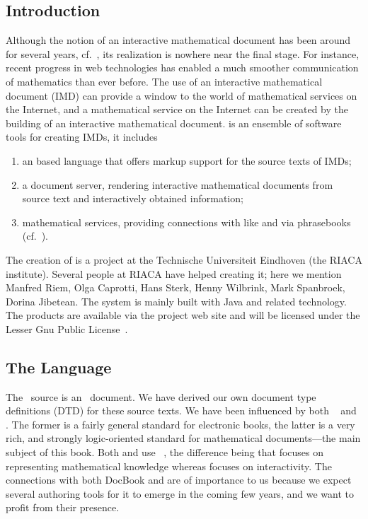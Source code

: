 \subsection{Introduction}
Although the notion of an interactive mathematical document has been around for several
years, cf.~\cite{CohMee:tapap98}, its realization is nowhere near the final stage. For
instance, recent progress in web technologies has enabled a much smoother communication of
mathematics than ever before. The use of an interactive mathematical document (IMD) can
provide a window to the world of mathematical services on the Internet, and a mathematical
service on the Internet can be created by the building of an interactive mathematical
document.  {\MathDox} is an ensemble of software tools for creating IMDs, it includes
\begin{enumerate}
\item an {\xml} based language that offers markup support for the source texts of IMDs;
\item a document server, rendering interactive mathematical documents from source text and
  interactively obtained information;
\item mathematical services, providing connections with {} like {\mathematica} and
  {\gap} via {\openmath} phrasebooks (cf.~\cite{URL:omsoc}).
\end{enumerate}

The creation of {\MathDox} is a project at the Technische Universiteit Eindhoven (the
RIACA institute).  Several people at RIACA have helped creating it; here we mention
Manfred Riem, Olga Caprotti, Hans Sterk, Henny Wilbrink, Mark Spanbroek, Dorina Jibetean.
The system is mainly built with Java and related technology.  The products are available
via the project web site and will be licensed under the Lesser Gnu Public
License~\cite{LGPL}.


\subsection{The Language}\label{uisection}
The \MathDox\ source is an \xml\ document.  We have derived our own document type
definitions (DTD) for these source texts.  We have been influenced by both
{\docbook}~\cite{WalMue:dtdg99} and {\omdoc}. The former is a fairly general standard for
electronic books, the latter is a very rich, and strongly logic-oriented standard for
mathematical documents---the main subject of this book.  Both {\omdoc} and {\MathDox} use
{\openmath}~\cite{BusCapCar:2oms04}, the difference being that {\omdoc} focuses on
representing mathematical knowledge whereas {\MathDox} focuses on interactivity.  The
connections with both DocBook and {\omdoc} are of importance to us because we expect
several authoring tools for it to emerge in the coming few years, and we want to profit
from their presence.

